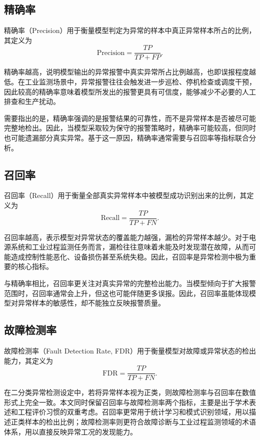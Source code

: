 \subsection{精确率}

精确率（Precision）用于衡量模型判定为异常的样本中真正异常样本所占的比例，其定义为
\begin{equation}
    \mathrm{Precision}
    =
    \frac{TP}{TP + FP}.
\end{equation}

精确率越高，说明模型输出的异常报警中真实异常所占比例越高，也即误报程度越低。在工业监测场景中，异常报警往往会触发进一步巡检、停机检查或调度干预，因此较高的精确率意味着模型所发出的报警更具有可信度，能够减少不必要的人工排查和生产扰动。

需要指出的是，精确率强调的是报警结果的可靠性，而不是异常样本是否被尽可能完整地检出。因此，当模型采取较为保守的报警策略时，精确率可能较高，但同时也可能遗漏部分真实异常。基于这一原因，精确率通常需要与召回率等指标联合分析。

\subsection{召回率}

召回率（Recall）用于衡量全部真实异常样本中被模型成功识别出来的比例，其定义为
\begin{equation}
    \mathrm{Recall}
    =
    \frac{TP}{TP + FN}.
\end{equation}

召回率越高，表示模型对异常状态的覆盖能力越强，漏检的异常样本越少。对于电源系统和工业过程监测任务而言，漏检往往意味着未能及时发现潜在故障，从而可能造成控制性能恶化、设备损伤甚至系统失稳。因此，召回率是异常检测中极为重要的核心指标。

与精确率相比，召回率更关注对真实异常的完整检出能力。当模型倾向于扩大报警范围时，召回率通常会上升，但这也可能伴随更多误报。因此，召回率虽能体现模型对异常样本的敏感性，却不能独立反映报警质量。

\subsection{故障检测率}

故障检测率（Fault Detection Rate, FDR）用于衡量模型对故障或异常状态的检出能力，其定义为
\begin{equation}
    \mathrm{FDR}
    =
    \frac{TP}{TP + FN}.
\end{equation}

在二分类异常检测设定中，若将异常样本视为正类，则故障检测率与召回率在数值形式上完全一致。本文同时保留召回率与故障检测率两个指标，主要是出于学术表述和工程评价习惯的双重考虑。召回率更常用于统计学习和模式识别领域，用以描述正类样本的检出比例；故障检测率则更符合故障诊断与工业过程监测领域的术语体系，用以直接反映异常工况的发现能力。

